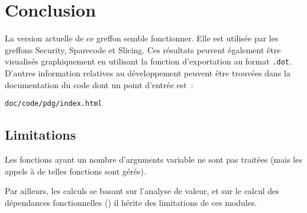 \chapter{Conclusion}

La version actuelle de ce greffon semble fonctionner.
Elle est utilisée par les greffons {\sc Security}, {\sc Sparecode} et
{\sc Slicing}. Ces résultats peuvent également être visualisés
graphiquement en utilisant la fonction d'exportation
au format {\tt .dot}.\\

D'autres information relatives au développement peuvent être trouvées dans la documentation du code dont un point d'entrée
est~:

\centerline{\tt doc/code/pdg/index.html}

\section{Limitations}

Les fonctions ayant un nombre d'arguments variable 
ne sont pas traitées (mais les appels à de telles fonctions sont gérés).

Par ailleurs, les calculs se basant sur l'analyse de valeur,
et sur le calcul des dépendances fonctionnelles (\from)
il hérite des limitations de ces modules.

